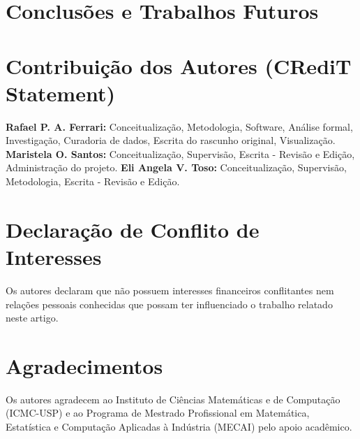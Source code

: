 \documentclass[preprint,12pt,authoryear]{elsarticle}
\begin{document}
\section{Conclusões e Trabalhos Futuros}
\label{sec:conclusions}
\lipsum[108-115]


\section*{Contribuição dos Autores (CRediT Statement)}
\textbf{Rafael P. A. Ferrari:} Conceitualização, Metodologia, Software, Análise formal, Investigação, Curadoria de dados, Escrita do rascunho original, Visualização.
\textbf{Maristela O. Santos:} Conceitualização, Supervisão, Escrita - Revisão e Edição, Administração do projeto.
\textbf{Eli Angela V. Toso:} Conceitualização, Supervisão, Metodologia, Escrita - Revisão e Edição.

\section*{Declaração de Conflito de Interesses}
Os autores declaram que não possuem interesses financeiros conflitantes nem relações pessoais conhecidas que possam ter influenciado o trabalho relatado neste artigo.

\section*{Agradecimentos}
Os autores agradecem ao Instituto de Ciências Matemáticas e de Computação (ICMC-USP) e ao Programa de Mestrado Profissional em Matemática, Estatística e Computação Aplicadas à Indústria (MECAI) pelo apoio acadêmico.



\end{document}
